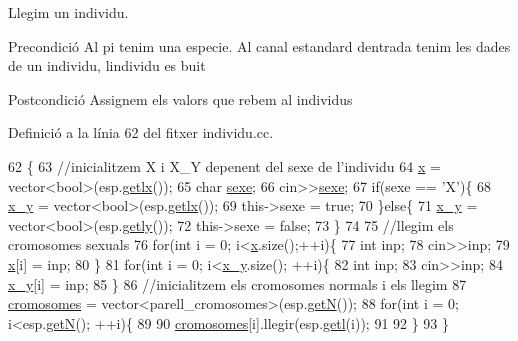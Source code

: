 Llegim un individu. 

\begin{DoxyPrecond}{Precondició}
Al pi tenim una especie. Al canal estandard d\textquotesingle{}entrada tenim les dades de un individu, l\textquotesingle{}individu es buit 
\end{DoxyPrecond}
\begin{DoxyPostcond}{Postcondició}
Assignem els valors que rebem al individus 
\end{DoxyPostcond}


Definició a la línia 62 del fitxer individu.\+cc.


\begin{DoxyCode}
62                                 \{
63         \textcolor{comment}{//inicialitzem X i X\_Y depenent del sexe de l'individu}
64   \hyperlink{classindividu_a3c4abda8daead156b5519f69bd224fa9}{x} = vector<bool>(esp.\hyperlink{classespecie_a98735feb10fd44e1316708566790ca95}{getlx}());
65   \textcolor{keywordtype}{char} \hyperlink{classindividu_ab62faa6985cc0520c33a206fc5a89e37}{sexe};
66   cin>>\hyperlink{classindividu_ab62faa6985cc0520c33a206fc5a89e37}{sexe};
67   \textcolor{keywordflow}{if}(sexe == \textcolor{charliteral}{'X'})\{
68     \hyperlink{classindividu_a51eb7827fdd5bd5302e3c962fd719fc0}{x\_y} = vector<bool>(esp.\hyperlink{classespecie_a98735feb10fd44e1316708566790ca95}{getlx}());
69     this->sexe = \textcolor{keyword}{true};    
70   \}\textcolor{keywordflow}{else}\{
71     \hyperlink{classindividu_a51eb7827fdd5bd5302e3c962fd719fc0}{x\_y} = vector<bool>(esp.\hyperlink{classespecie_aeae1b17938e4527858ad4d3f5949d182}{getly}());
72     this->sexe = \textcolor{keyword}{false};
73   \}
74         
75         \textcolor{comment}{//llegim els cromosomes sexuals}
76   \textcolor{keywordflow}{for}(\textcolor{keywordtype}{int} i = 0; i<\hyperlink{classindividu_a3c4abda8daead156b5519f69bd224fa9}{x}.size();++i)\{
77     \textcolor{keywordtype}{int} inp;
78     cin>>inp;
79     \hyperlink{classindividu_a3c4abda8daead156b5519f69bd224fa9}{x}[i] = inp;
80   \}
81   \textcolor{keywordflow}{for}(\textcolor{keywordtype}{int} i = 0; i<\hyperlink{classindividu_a51eb7827fdd5bd5302e3c962fd719fc0}{x\_y}.size(); ++i)\{
82     \textcolor{keywordtype}{int} inp;
83     cin>>inp;
84     \hyperlink{classindividu_a51eb7827fdd5bd5302e3c962fd719fc0}{x\_y}[i] = inp;
85   \}
86         \textcolor{comment}{//inicialitzem els cromosomes normals i els llegim}
87   \hyperlink{classindividu_ae5e0a83ff9e943cbcdf95b74069ad3a7}{cromosomes} = vector<parell\_cromosomes>(esp.\hyperlink{classespecie_a16cbac301660254cf39ef7f51690e507}{getN}());
88   \textcolor{keywordflow}{for}(\textcolor{keywordtype}{int} i = 0; i<esp.\hyperlink{classespecie_a16cbac301660254cf39ef7f51690e507}{getN}(); ++i)\{
89 
90     \hyperlink{classindividu_ae5e0a83ff9e943cbcdf95b74069ad3a7}{cromosomes}[i].llegir(esp.\hyperlink{classespecie_ac09e154b4eae25155af3bdc98c2a18c3}{getl}(i));
91 
92   \}
93 \}
\end{DoxyCode}
